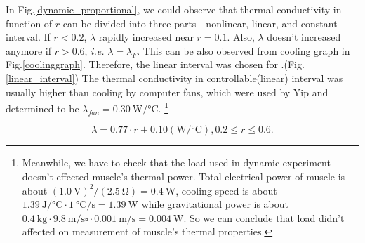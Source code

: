 In Fig.\ref{dynamic_proportional}, we could observe that thermal conductivity in function of $r$ can be divided into three parts - nonlinear, linear, and constant interval. If $r<0.2$, $\lambda$ rapidly increased near $r=0.1$. Also, $\lambda$ doesn't increased anymore if $r>0.6$, {\it i.e.} $\lambda = \lambda_{F}$. This can be also observed from cooling graph in Fig.\ref{coolinggraph}.
Therefore, the linear interval was chosen for \Apcnospace.(Fig.\ref{linear_interval}) The thermal conductivity in controllable(linear) interval was usually higher than cooling by computer fans, which were used by Yip \etalspace and determined to be $\lambda_{fan}=\SI{0.30}{\watt\per\degreeCelsius}$.
\footnote{
	Meanwhile, we have to check that the load used in dynamic experiment doesn't effected muscle's thermal power. %
	Total electrical power of muscle is about $(\SI{1.0}{\volt})^2/(\SI{2.5}{\ohm})=\SI{0.4}{\watt}$, cooling speed is about $\SI{1.39}{\joule\per\degreeCelsius} \cdot \SI{1}{\degreeCelsius\per\second}=\SI{1.39}{\watt}$ while gravitational power is about  $\SI{0.4}{\kilo\gram} \cdot  \SI{9.8}{\meter\per\second\square} \cdot \SI{0.001}{\meter\per\second}=\SI{0.004}{\watt}$. So we can conclude that load didn't affected on measurement of muscle's thermal properties.
}

\begin{equation} \label{lambda_control}
\lambda = 0.77\cdot r + 0.10 (\si{\watt\per\degreeCelsius}), 0.2\leq r \leq 0.6.
\end{equation}





